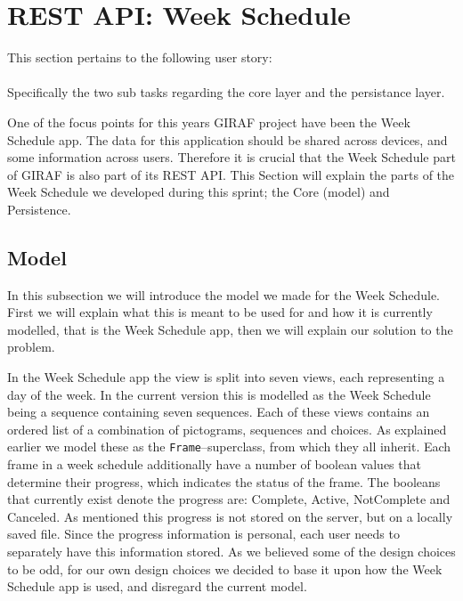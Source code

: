 \section{REST API: Week Schedule}\label{sec:restws}
This section pertains to the following user story: \\
 \\
Specifically the two sub tasks regarding the core layer and the persistance layer.

\noindent
One of the focus points for this years GIRAF project have been the Week Schedule app.
The data for this application should be shared across devices, and some information across users.
Therefore it is crucial that the Week Schedule part of GIRAF is also part of its REST API.
This Section will explain the parts of the Week Schedule we developed during this sprint; the Core (model) and Persistence. 

\subsection{Model}
In this subsection we will introduce the model we made for the Week Schedule.
First we will explain what this is meant to be used for and how it is currently modelled, that is the Week Schedule app, then we will explain our solution to the problem. 

In the Week Schedule app the view is split into seven views, each representing a day of the week.
In the current version this is modelled as the Week Schedule being a sequence containing seven sequences.
Each of these views contains an ordered list of a combination of pictograms, sequences and choices.
As explained earlier we model these as the \texttt{Frame}--superclass, from which they all inherit. %
Each frame in a week schedule additionally have a number of boolean values that determine their progress, which indicates the status of the frame. 
The booleans that currently exist denote the progress are: Complete, Active, NotComplete and Canceled. 
As mentioned this progress is not stored on the server, but on a locally saved file.
Since the progress information is personal, each user needs to separately have this information stored. 
As we believed some of the design choices to be odd, for our own design choices we decided to base it upon how the Week Schedule app is used, and disregard the current model.

